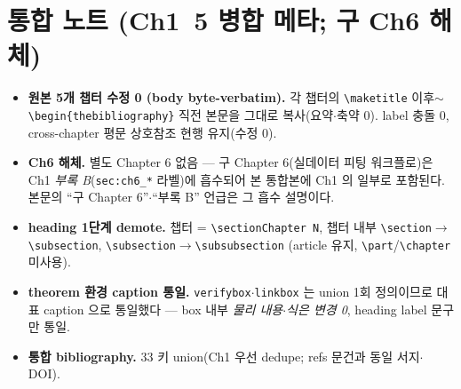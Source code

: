 \section*{통합 노트 (Ch1~5 병합 메타; 구 Ch6 해체)}
\begin{itemize}[leftmargin=1.6em]
\item \textbf{원본 5개 챕터 수정 0 (body byte-verbatim).} 각 챕터의 \texttt{\textbackslash maketitle}
  이후$\sim$\texttt{\textbackslash begin\{thebibliography\}} 직전 본문을 그대로 복사(요약$\cdot$축약 0).
  label 충돌 0, cross-chapter 평문 상호참조 현행 유지(수정 0).
\item \textbf{Ch6 해체.} 별도 Chapter 6 없음 — 구 Chapter 6(실데이터 피팅 워크플로)은 Ch1
  \emph{부록 B}(\texttt{sec:ch6\_*} 라벨)에 흡수되어 본 통합본에 Ch1 의 일부로 포함된다.
  본문의 ``구 Chapter 6''$\cdot$``부록 B'' 언급은 그 흡수 설명이다.
\item \textbf{heading 1단계 demote.} 챕터 = \texttt{\textbackslash section{Chapter N}}, 챕터 내부
  \texttt{\textbackslash section}$\to$\texttt{\textbackslash subsection},
  \texttt{\textbackslash subsection}$\to$\texttt{\textbackslash subsubsection}
  (article 유지, \texttt{\textbackslash part}/\texttt{\textbackslash chapter} 미사용).
\item \textbf{theorem 환경 caption 통일.} \texttt{verifybox}$\cdot$\texttt{linkbox} 는 union 1회
  정의이므로 대표 caption 으로 통일했다 — box 내부 \emph{물리 내용$\cdot$식은 변경 0}, heading label 문구만 통일.
\item \textbf{통합 bibliography.} 33 키 union(Ch1 우선 dedupe; refs 문건과 동일 서지$\cdot$DOI).
\end{itemize}


